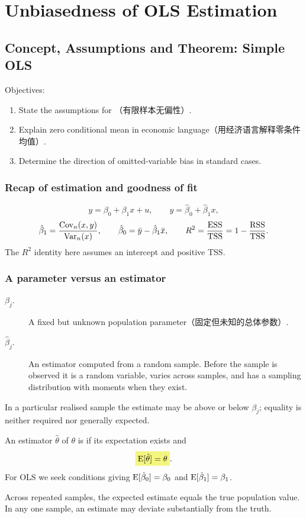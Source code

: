 \chapter{Unbiasedness of OLS Estimation}
\label{ch:week4}
\section{Concept, Assumptions and Theorem: Simple OLS}
\label{sec:unbiasedness-concept}
Objectives:
\begin{enumerate}
\item State the assumptions for （有限样本无偏性）.
\item Explain zero conditional mean in economic language（用经济语言解释零条件均值）.
\item Determine the direction of omitted-variable bias in standard cases.
\end{enumerate}
\subsection{Recap of estimation and goodness of fit}
\[y=\beta_0+\beta_1x+u,\qquad
\hat y=\hat\beta_0+\hat\beta_1x,\]
\[\hat\beta_1=\frac{\operatorname{Cov}_n(x,y)}{\operatorname{Var}_n(x)},\qquad
\hat\beta_0=\bar y-\hat\beta_1\bar x,\qquad
R^2=\frac{\operatorname{ESS}}{\operatorname{TSS}}=1-\frac{\operatorname{RSS}}{\operatorname{TSS}}.\]
The $R^2$ identity here assumes an intercept and positive TSS.

\subsection{A parameter versus an estimator}
\begin{description}
\item[$\beta_j$.] A fixed but unknown population parameter（固定但未知的总体参数）.
\item[$\hat\beta_j$.] An estimator computed from a random sample. Before the sample is observed it is a random variable, varies across samples, and has a sampling distribution with moments when they exist.
\end{description}
In a particular realised sample the estimate may be above or below $\beta_j$; equality is neither required nor generally expected.

\begin{definition}
An estimator $\hat\theta$ of $\theta$ is  if its expectation exists and
\[\hm{\E[\hat\theta]=\theta}.\]
For OLS we seek conditions giving $\operatorname{E}[\hat\beta_0]=\beta_0$ and $\operatorname{E}[\hat\beta_1]=\beta_1$.
\end{definition}
Across repeated samples, the expected estimate equals the true population value. In any one sample, an estimate may deviate substantially from the truth. 

